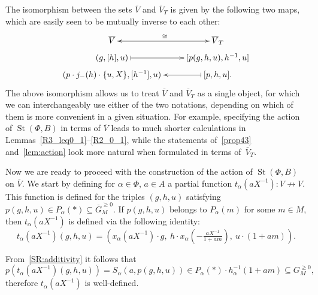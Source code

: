 \documentclass[oneside, 8pt]{amsart}
\theoremstyle{remark}
\theoremstyle{definition}
\numberwithin{lemma}{section}
\numberwithin{prop}{section}
\numberwithin{corollary}{section}
\numberwithin{externaltheorem}{section}
\DeclareMathOperator{\St}{St}
\numberwithin{equation}{section}
\begin{document}
The isomorphism between the sets $\overline{V}$ and $\overline{V}_T$ is given by the following two maps, which are easily seen to be mutually inverse to each other:
\begin{equation} \label{eq:VVT} \xymatrix @R0.3pc {\overline{V} \ar[r]^{\cong} & \ar[l] \overline{V}_T \\ (g, [h], u) \ar@{|->}[r] & [p(g, h, u), h^{-1}, u] \\ (p \cdot j_-(h) \cdot \{u, X\}, [h^{-1}], u) & \ar@{|->}[l] [p, h, u]. } \end{equation}
The above isomorphism allows us to treat $\overline{V}$ and $\overline{V}_T$ as a single object, for which we can interchangeably use either of the two notations,
 depending on which of them is more convenient in a given situation.
For example, specifying the action of $\St(\Phi, B)$ in terms of $\overline{V}$ leads to much shorter calculations in Lemmas~\ref{R3_leq0_1}--\ref{R2_0_1},
 while the statements of~\cref{prop43} and~\cref{lem:action} look more natural when formulated in terms of~$\overline{V}_T$. 

Now we are ready to proceed with the construction of the action of $\St(\Phi, B)$ on $\overline{V}$. We start by defining for $\alpha \in \Phi$, $a \in A$ a partial function $t_\alpha(aX^{-1}) \colon V \not\to V$.
This function is defined for the triples $(g, h, u)$ satisfying $p(g, h, u) \in P_\alpha(*) \subseteq \overline{G}_M^{\geq 0}$.
If $p(g, h, u)$ belongs to $P_\alpha(m)$ for some $m \in M$, then $t_\alpha(aX^{-1})$ is defined via the following identity:
\begin{equation} \label{T_1} t_\alpha(aX^{-1}) (g, h, u) = \left( x_\alpha(aX^{-1})\cdot g ,\ h \cdot x_\alpha\left(-\tfrac{aX^{-1}}{1 + am}\right),\ u \cdot (1 + am)\right).\end{equation}

From~\cref{SR:additivity} it follows that
\[p\left(t_\alpha(aX^{-1}) (g, h, u)\right) = S_\alpha(a, p(g, h, u)) \in P_\alpha(*) \cdot h_{\alpha}^{-1}(1+am) \subseteq G_M^{\geq 0},\]
therefore $t_\alpha(aX^{-1})$ is well-defined.
\end{document}

